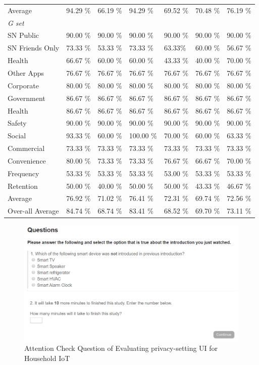 \begin{table}
\begin{tabular}{P{2.5cm}P{1.7cm}P{1.6cm}P{1.5cm}P{1.5cm}P{1.5cm}P{1.9cm}}
\cmidrule(r){2-7}
Average & 94.29 \%& 66.19 \% & 94.29 \% & 69.52 \% &  70.48 \% & 76.19 \%\\
\cmidrule(r){1-7}

\textit{G set}\\
SN Public &90.00 \% &90.00 \% &90.00 \%  & 90.00 \% &90.00 \% &90.00 \%\\
SN Friends Only &73.33 \% &53.33 \% &73.33 \% & 63.33\% &60.00 \% &56.67 \%\\
Health &66.67 \% &60.00 \% &60.00 \%  & 43.33 \% &40.00 \% &70.00 \%\\
Other Apps &76.67 \% &76.67 \% &76.67 \% & 76.67 \% & 76.67 \% &76.67 \%\\
Corporate & 80.00 \% & 80.00 \% & 80.00 \% & 80.00 \% & 80.00 \% & 80.00 \%\\
Government &86.67 \% & 86.67 \% &86.67 \% & 86.67 \% & 86.67 \% &86.67 \%\\
Health &86.67 \% &86.67 \% &86.67 \% & 86.67 \% & 86.67 \% &86.67 \%\\
Safety &90.00 \% & 90.00 \% & 90.00 \%  & 90.00 \% & 90.00 \% &90.00 \%\\
Social &93.33 \% &60.00 \% &100.00 \% & 70.00 \% & 60.00 \% &63.33 \%\\
Commercial & 73.33 \% & 73.33 \% & 73.33 \% & 73.33 \% & 73.33 \%&73.33 \%\\
Convenience & 80.00 \% & 73.33 \% &73.33 \% & 76.67 \% & 66.67 \% & 70.00 \%\\
Frequency & 53.33 \% & 53.33 \% &53.33 \% & 53.00 \% & 53.33 \% & 53.33 \%\\
Retention &50.00 \% & 40.00 \% & 50.00 \% & 50.00 \% & 43.33 \% & 46.67 \%\\

\cmidrule(r){2-7}
Average & 76.92 \% & 71.02 \% & 76.41 \% & 72.31 \% & 69.74 \% & 72.56 \%\\
\cmidrule(r){1-7}
Over-all Average & 84.74 \% & 68.74 \% & 83.41 \% & 68.52 \% & 69.70 \% & 73.11 \%  \\
\end{tabular}
\end{table}

\begin{figure}
	\centering
	\includegraphics[width=\textwidth]{figures/yangAttentionCheck.png}
	\caption{Attention Check Question of Evaluating privacy-setting UI for Household IoT}
	\label{fig:yangAttentionCheck}
\end{figure}

